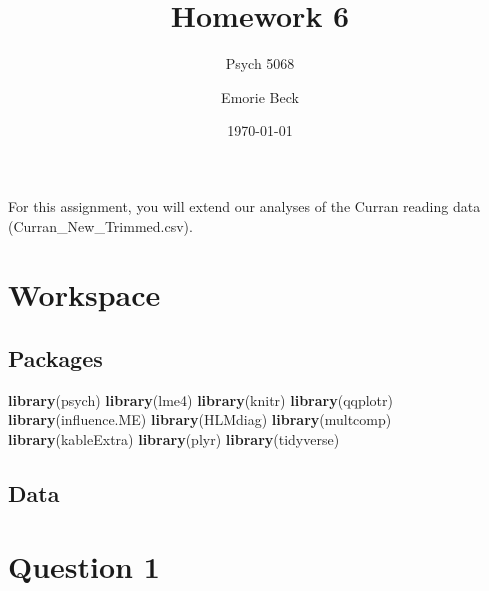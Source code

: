 \documentclass[]{article}
\title{Homework 6}
\subtitle{Psych 5068}
\author{Emorie Beck}
\date{\today}
\newenvironment{Shaded}{\begin{snugshade}}{\end{snugshade}}
\newcommand{\KeywordTok}[1]{\textcolor[rgb]{0.13,0.29,0.53}{\textbf{#1}}}
\newcommand{\StringTok}[1]{\textcolor[rgb]{0.31,0.60,0.02}{#1}}
\newcommand{\OperatorTok}[1]{\textcolor[rgb]{0.81,0.36,0.00}{\textbf{#1}}}
\newcommand{\NormalTok}[1]{#1}
\begin{document}
\maketitle

{
\setcounter{tocdepth}{2}
\tableofcontents
}
For this assignment, you will extend our analyses of the Curran reading
data (Curran\_New\_Trimmed.csv).

\section{Workspace}\label{workspace}

\subsection{Packages}\label{packages}

\begin{Shaded}
\begin{Highlighting}[]
\KeywordTok{library}\NormalTok{(psych)}
\KeywordTok{library}\NormalTok{(lme4)}
\KeywordTok{library}\NormalTok{(knitr)}
\KeywordTok{library}\NormalTok{(qqplotr)}
\KeywordTok{library}\NormalTok{(influence.ME)}
\KeywordTok{library}\NormalTok{(HLMdiag)}
\KeywordTok{library}\NormalTok{(multcomp)}
\KeywordTok{library}\NormalTok{(kableExtra)}
\KeywordTok{library}\NormalTok{(plyr)}
\KeywordTok{library}\NormalTok{(tidyverse)}
\end{Highlighting}
\end{Shaded}

\subsection{Data}\label{data}

\begin{Shaded}
\end{Shaded}

\section{Question 1}\label{question-1}
\end{document}
